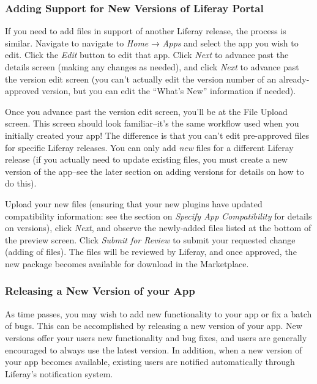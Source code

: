 \subsubsection{Adding Support for New Versions of Liferay
Portal}\label{adding-support-for-new-versions-of-liferay-portal}

If you need to add files in support of another Liferay release, the
process is similar. Navigate to navigate to \emph{Home} → \emph{Apps}
and select the app you wish to edit. Click the \emph{Edit} button to
edit that app. Click \emph{Next} to advance past the details screen
(making any changes as needed), and click \emph{Next} to advance past
the version edit screen (you can't actually edit the version number of
an already-approved version, but you can edit the ``What's New''
information if needed).

Once you advance past the version edit screen, you'll be at the File
Upload screen. This screen should look familiar--it's the same workflow
used when you initially created your app! The difference is that you
can't edit pre-approved files for specific Liferay releases. You can
only add \emph{new} files for a different Liferay release (if you
actually need to update existing files, you must create a new version of
the app--see the later section on adding versions for details on how to
do this).

Upload your new files (ensuring that your new plugins have updated
compatibility information: see the section on \emph{Specify App
Compatibility} for details on versions), click \emph{Next}, and observe
the newly-added files listed at the bottom of the preview screen. Click
\emph{Submit for Review} to submit your requested change (adding of
files). The files will be reviewed by Liferay, and once approved, the
new package becomes available for download in the Marketplace.

\subsubsection{Releasing a New Version of your
App}\label{releasing-a-new-version-of-your-app}

As time passes, you may wish to add new functionality to your app or fix
a batch of bugs. This can be accomplished by releasing a new version of
your app. New versions offer your users new functionality and bug fixes,
and users are generally encouraged to always use the latest version. In
addition, when a new version of your app becomes available, existing
users are notified automatically through Liferay's notification system.

